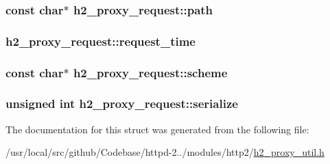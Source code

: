 \subsubsection[{\texorpdfstring{path}{path}}]{\setlength{\rightskip}{0pt plus 5cm}const char$\ast$ h2\+\_\+proxy\+\_\+request\+::path}\hypertarget{structh2__proxy__request_a7e29bb6643f5156b4a4b6b914a6d17df}{}\label{structh2__proxy__request_a7e29bb6643f5156b4a4b6b914a6d17df}
\subsubsection[{\texorpdfstring{request\+\_\+time}{request_time}}]{ h2\+\_\+proxy\+\_\+request\+::request\+\_\+time}\hypertarget{structh2__proxy__request_a67a6f3d7961c7befb804df9a061637e9}{}\label{structh2__proxy__request_a67a6f3d7961c7befb804df9a061637e9}
\subsubsection[{\texorpdfstring{scheme}{scheme}}]{\setlength{\rightskip}{0pt plus 5cm}const char$\ast$ h2\+\_\+proxy\+\_\+request\+::scheme}\hypertarget{structh2__proxy__request_a15c79eed4cfcaacd0540dcd306d2a2af}{}\label{structh2__proxy__request_a15c79eed4cfcaacd0540dcd306d2a2af}
\subsubsection[{\texorpdfstring{serialize}{serialize}}]{\setlength{\rightskip}{0pt plus 5cm}unsigned {\bf int} h2\+\_\+proxy\+\_\+request\+::serialize}\hypertarget{structh2__proxy__request_aafb9028cabadceca1711bc2df16325e0}{}\label{structh2__proxy__request_aafb9028cabadceca1711bc2df16325e0}


The documentation for this struct was generated from the following file\+:\begin{DoxyCompactItemize}
\item 
/usr/local/src/github/\+Codebase/httpd-\/2../modules/http2/\hyperlink{h2__proxy__util_8h}{h2\+\_\+proxy\+\_\+util.\+h}\end{DoxyCompactItemize}
